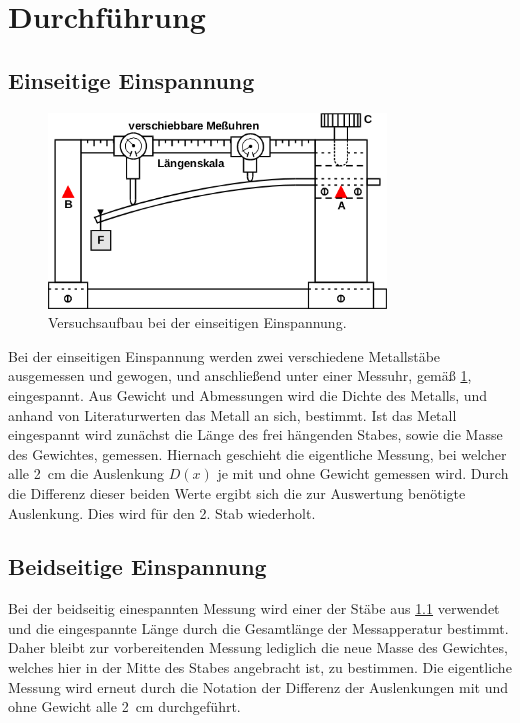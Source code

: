 \section{Durchführung}
\label{sec:Durchführung}
\subsection{Einseitige Einspannung}
\label{sec:eins}
\begin{figure}
  \centering
  \includegraphics[width=0.8\textwidth]{content/images/Abbildung2.png}
  \caption{Versuchsaufbau bei der einseitigen Einspannung.}
  \label{fig:abb2}
\end{figure}
Bei der einseitigen Einspannung werden zwei verschiedene Metallstäbe ausgemessen
und gewogen, und anschließend unter einer Messuhr, gemäß \ref{fig:abb2}, eingespannt.
Aus Gewicht und Abmessungen wird die Dichte des Metalls, und anhand von Literaturwerten
\cite{litval} das Metall an sich, bestimmt. Ist das Metall eingespannt wird zunächst
die Länge des frei hängenden Stabes, sowie die Masse des Gewichtes, gemessen. Hiernach geschieht die eigentliche Messung,
bei welcher alle \SI{2}{\centi\meter} die Auslenkung $D(x)$ je mit und ohne Gewicht gemessen wird.
Durch die Differenz dieser beiden Werte ergibt sich die zur Auswertung benötigte Auslenkung. Dies wird für den
2. Stab wiederholt.
\subsection{Beidseitige Einspannung}
\label{sec:beid}
Bei der beidseitig einespannten Messung wird einer der Stäbe aus \ref{sec:eins}
verwendet und die eingespannte Länge durch die Gesamtlänge der Messapperatur bestimmt.
Daher bleibt zur vorbereitenden Messung lediglich die neue Masse des Gewichtes, welches hier
in der Mitte des Stabes angebracht ist, zu bestimmen. Die eigentliche Messung wird erneut durch
die Notation der Differenz der Auslenkungen mit und ohne Gewicht alle \SI{2}{\centi\meter} durchgeführt.
